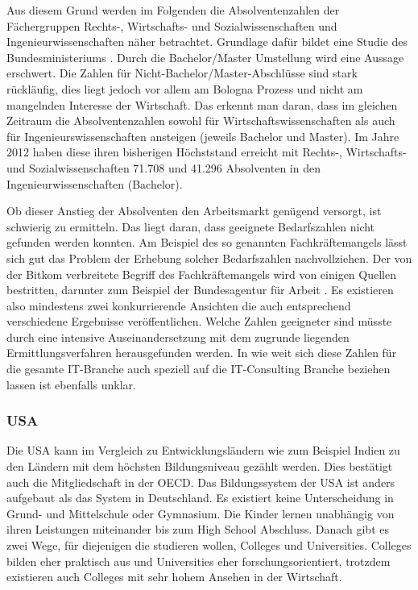 Aus diesem Grund werden im Folgenden die Absolventenzahlen der Fächergruppen Rechts-, Wirtschafts- und Sozialwissenschaften und Ingenieurwissenschaften näher betrachtet.
Grundlage dafür bildet eine Studie des Bundesministeriums \cite{absolventen}. Durch die Bachelor/Master Umstellung wird eine Aussage erschwert. Die Zahlen für Nicht-Bachelor/Master-Abschlüsse sind stark rückläufig, dies liegt jedoch vor allem am Bologna Prozess und nicht am mangelnden Interesse der Wirtschaft. Das erkennt man daran, dass im gleichen Zeitraum die Absolventenzahlen sowohl für Wirtschaftswissenschaften als auch für Ingenieurswissenschaften ansteigen (jeweils Bachelor und Master). Im Jahre 2012 haben diese ihren bisherigen Höchststand erreicht mit Rechts-, Wirtschafts- und Sozialwissenschaften 71.708 und 41.296 Absolventen in den Ingenieurwissenschaften (Bachelor).

Ob dieser Anstieg der Absolventen den Arbeitsmarkt genügend versorgt, ist schwierig zu ermitteln. Das liegt daran, dass geeignete Bedarfszahlen nicht gefunden werden konnten. Am Beispiel des so genannten Fachkräftemangels lässt sich gut das Problem der Erhebung solcher Bedarfszahlen nachvollziehen. Der von der Bitkom verbreitete Begriff \cite{fachkraft} des Fachkräftemangels wird von einigen Quellen bestritten, darunter zum Beispiel der Bundesagentur für Arbeit \cite{fachkraftnein}. Es existieren also mindestens zwei konkurrierende Ansichten die auch entsprechend verschiedene Ergebnisse veröffentlichen. Welche Zahlen geeigneter sind müsste durch eine intensive Auseinandersetzung mit dem zugrunde liegenden Ermittlungsverfahren herausgefunden werden.  In wie weit sich diese Zahlen für die gesamte IT-Branche auch speziell auf die IT-Consulting Branche beziehen lassen ist ebenfalls unklar.

\subsubsection*{USA}
Die USA kann im Vergleich zu Entwicklungsländern wie zum Beispiel Indien zu den Ländern mit dem höchsten Bildungsniveau gezählt werden. Dies bestätigt auch die Mitgliedschaft in der OECD. Das Bildungssystem der USA ist anders aufgebaut als das System in Deutschland. Es existiert keine Unterscheidung in Grund- und Mittelschule oder Gymnasium. Die Kinder lernen unabhängig von ihren Leistungen miteinander bis zum High School Abschluss. Danach gibt es zwei Wege, für diejenigen die studieren wollen, Colleges und Universities. Colleges bilden eher praktisch aus und Universities eher forschungsorientiert, trotzdem existieren auch Colleges mit sehr hohem Ansehen in der Wirtschaft. 

